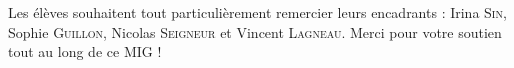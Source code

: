 \documentclass{article}
\begin{document}

Les élèves souhaitent tout particulièrement remercier leurs encadrants : Irina \textsc{Sin}, Sophie \textsc{Guillon}, Nicolas \textsc{Seigneur} et Vincent \textsc{Lagneau}. Merci pour votre soutien tout au long de ce MIG !
\end{document}
